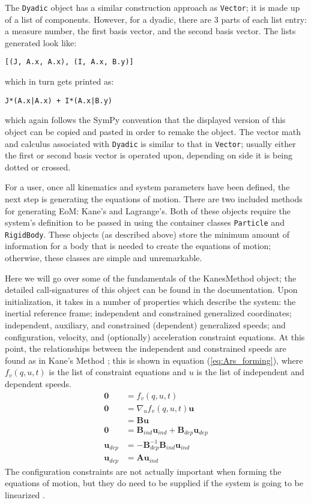\documentclass[twocolumn,10pt]{asme2e}
\begin{document}
The \verb|Dyadic| object has a similar construction approach as \verb|Vector|;
it is made up of a list of components.
However, for a dyadic, there are 3 parts of each list entry: a measure number,
the first basis vector, and the second basis vector.
The lists generated look like:
\begin{verbatim}
[(J, A.x, A.x), (I, A.x, B.y)]
\end{verbatim}
which in turn gets printed as:
\begin{verbatim}
J*(A.x|A.x) + I*(A.x|B.y)
\end{verbatim}
which again follows the SymPy convention that the displayed version of this
object can be copied and pasted in order to remake the object.
The vector math and calculus associated with \verb|Dyadic| is similar to that
in \verb|Vector|; usually either the first or second basis vector is operated
upon, depending on side it is being dotted or crossed.

For a user, once all kinematics and system parameters have been defined, the
next step is generating the equations of motion.
There are two included methods for generating EoM: Kane's and Lagrange's.
Both of these objects require the system's definition to be passed in using the
container classes \verb|Particle| and \verb|RigidBody|.
These objects (as described above) store the minimum amount of information for
a body that is needed to create the equations of motion; otherwise, these
classes are simple and unremarkable.

Here we will go over some of the fundamentals of the KanesMethod object; the
detailed call-signatures of this object can be found in the documentation.
Upon initialization, it takes in a number of properties which describe the
system: the inertial reference frame; independent and constrained generalized
coordinates; independent, auxiliary, and constrained (dependent) generalized
speeds; and configuration, velocity, and (optionally) acceleration constraint
equations.  At this point, the relationships between the independent and
constrained speeds are found as in Kane's Method \cite{Kane1985}; this is shown
in equation (\ref{eq:Ars_forming}), where $f_v(q, u, t)$ is the list of
constraint equations and $u$ is the list of independent and dependent speeds.
\begin{align}
\mathbf{0} &= f_v(q, u, t) \\
\mathbf{0} &= \nabla_u f_v(q, u, t) \mathbf{u} \\
           &= \mathbf{B} \mathbf{u} \\
\mathbf{0} &= \mathbf{B}_{ind} \mathbf{u}_{ind} + \mathbf{B}_{dep}
\mathbf{u}_{dep} \\
\mathbf{u}_{dep} &= - \mathbf{B}_{dep}^{-1} \mathbf{B}_{ind} \mathbf{u}_{ind} \\
\mathbf{u}_{dep} &= \mathbf{A} \mathbf{u}_{ind}
\label{eq:Ars_forming}
\end{align}
The configuration constraints are not actually important when forming the
equations of motion, but they do need to be supplied if the system is going to
be linearized \cite{Peterson2013}.
\end{document}
